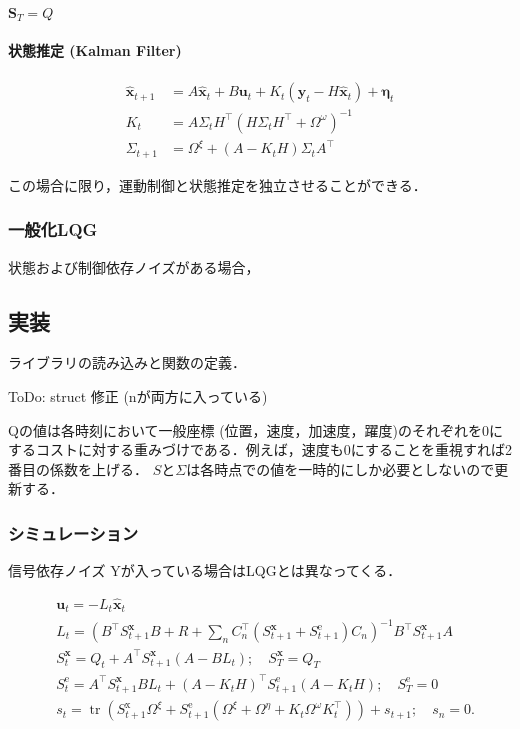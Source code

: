 $\boldsymbol{S}_{T}=Q$

\paragraph{状態推定 (Kalman Filter)}


\begin{align}
\widehat{\mathbf{x}}_{t+1}&=A \widehat{\mathbf{x}}_{t}+B \mathbf{u}_{t}+K_{t}\left(\mathbf{y}_{t}-H \widehat{\mathbf{x}}_{t}\right)+\boldsymbol{\eta}_{t} \\ 
K_{t}&=A \Sigma_{t} H^{\top}\left(H \Sigma_{t} H^{\top}+\Omega^{\omega}\right)^{-1} \\ 
\Sigma_{t+1}&=\Omega^{\xi}+\left(A-K_{t} H\right) \Sigma_{t} A^{\top}
\end{align}


この場合に限り，運動制御と状態推定を独立させることができる．
\subsubsection{一般化LQG}
状態および制御依存ノイズがある場合，
\subsection{実装}
ライブラリの読み込みと関数の定義．

ToDo: struct 修正 (nが両方に入っている) 

Qの値は各時刻において一般座標 (位置，速度，加速度，躍度)のそれぞれを0にするコストに対する重みづけである．例えば，速度も0にすることを重視すれば2番目の係数を上げる．
$S$と$\Sigma$は各時点での値を一時的にしか必要としないので更新する．

\subsubsection{シミュレーション}
信号依存ノイズ Yが入っている場合はLQGとは異なってくる．


\begin{align}
&\mathbf{u}_{t}=-L_{t} \hat{\mathbf{x}}_{t} \\
&L_{t}=\left(B^\top S_{t+1}^{\mathbf{x}} B+R+\sum_{n} C_{n}^\top\left(S_{t+1}^{\mathbf{x}}+S_{t+1}^{\mathrm{e}}\right) C_{n}\right)^{-1} B^\top S_{t+1}^{\mathbf{x}} A \\
&S_{t}^{\mathbf{x}}=Q_{t}+A^\top S_{t+1}^{\mathbf{x}}\left(A-B L_{t}\right) ; \quad S_{T}^{\mathbf{x}}=Q_{T} \\
&S_{t}^{\mathrm{e}}=A^\top S_{t+1}^{\mathbf{x}} B L_t+\left(A-K_{t} H\right)^\top S_{t+1}^{\mathrm{e}}\left(A-K_{t} H\right) ; \quad S_{T}^{\mathrm{e}}=0\\
&s_{t}=\operatorname{tr}\left(S_{t+1}^{\mathrm{x}}\Omega^{\xi}+S_{t+1}^{\mathrm{e}}\left(\Omega^{\xi}+\Omega^{\eta}+K_{t} \Omega^{\omega} K_{t}^{\top}\right)\right)+s_{t+1} ; \quad s_{n}=0 .
\end{align}



